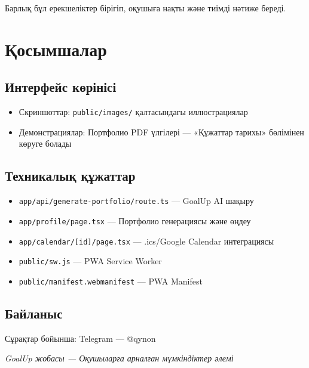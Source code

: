 \documentclass[12pt,a4paper]{article}
\begin{document}
Барлық бұл ерекшеліктер бірігіп, оқушыға нақты және тиімді нәтиже береді.

\section{Қосымшалар}

\subsection{Интерфейс көрінісі}
\begin{itemize}
    \item Скриншоттар: \texttt{public/images/} қалтасындағы иллюстрациялар
    \item Демонстрациялар: Портфолио PDF үлгілері — «Құжаттар тарихы» бөлімінен көруге болады
\end{itemize}

\subsection{Техникалық құжаттар}
\begin{itemize}
    \item \texttt{app/api/generate-portfolio/route.ts} — GoalUp AI шақыру
    \item \texttt{app/profile/page.tsx} — Портфолио генерациясы және өңдеу
    \item \texttt{app/calendar/[id]/page.tsx} — .ics/Google Calendar интеграциясы
    \item \texttt{public/sw.js} — PWA Service Worker
    \item \texttt{public/manifest.webmanifest} — PWA Manifest
\end{itemize}

\subsection{Байланыс}
Сұрақтар бойынша: Telegram — @qynon

\vfill
\begin{center}
\textcolor{goalupgray}{\textit{GoalUp жобасы — Оқушыларға арналған мүмкіндіктер әлемі}}
\end{center}
\end{document}
